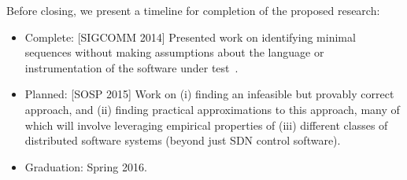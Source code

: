 Before closing, we present a timeline for completion of the proposed research:

\begin{itemize}
\item Complete: [SIGCOMM 2014] Presented work on identifying minimal sequences without making assumptions about the
language or instrumentation of the software under test~\cite{sts2014}.
\item Planned: [SOSP 2015] Work on (i) finding an infeasible but provably correct
approach, and (ii) finding practical approximations to this approach, many of which will
involve leveraging empirical properties of (iii) different classes of distributed software
systems (beyond just SDN control software).
\item Graduation: Spring 2016.
\end{itemize}
